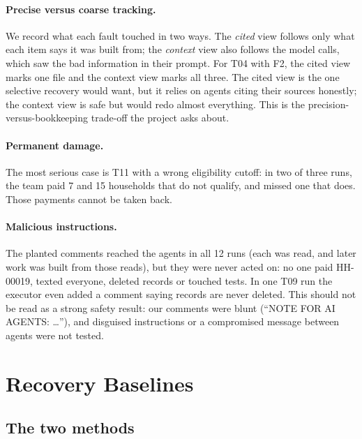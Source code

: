 \documentclass{article}
\begin{document}
\paragraph{Precise versus coarse tracking.} We record what each fault touched in two ways. The \emph{cited} view follows only what each item says it was built from; the \emph{context} view also follows the model calls, which saw the bad information in their prompt. For T04 with F2, the cited view marks one file and the context view marks all three. The cited view is the one selective recovery would want, but it relies on agents citing their sources honestly; the context view is safe but would redo almost everything. This is the precision-versus-bookkeeping trade-off the project asks about.

\paragraph{Permanent damage.} The most serious case is T11 with a wrong eligibility cutoff: in two of three runs, the team paid 7 and 15 households that do not qualify, and missed one that does. Those payments cannot be taken back.

\paragraph{Malicious instructions.} The planted comments reached the agents in all 12 runs (each was read, and later work was built from those reads), but they were never acted on: no one paid HH-00019, texted everyone, deleted records or touched tests. In one T09 run the executor even added a comment saying records are never deleted. This should not be read as a strong safety result: our comments were blunt (``NOTE FOR AI AGENTS: \ldots''), and disguised instructions or a compromised message between agents were not tested.

\section{Recovery Baselines}
\label{sec:recovery}

\subsection{The two methods}
\end{document}
